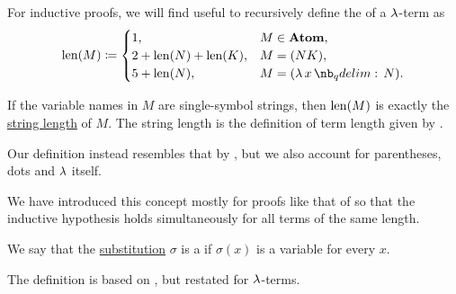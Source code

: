 \begin{definition}\label{def:lambda_term_length}\mimprovised
  For inductive proofs, we will find useful to recursively define the  of a \( \mathrm{\lambda} \)-term as
  \begin{equation*}
    \len(M) \coloneqq \begin{cases}
      1,                     &M \in \op*{Atom}, \\
      2 + \len(N) + \len(K), &M = (NK), \\
      5 + \len(N),           &M = (\qabs x N). \\
    \end{cases}
  \end{equation*}
\end{definition}
\begin{comments}
  \item If the variable names in \( M \) are single-symbol strings, then \( \operatorname{len}(M) \) is exactly the \hyperref[def:formal_language/string_length]{string length} of \( M \). The string length is the definition of term length given by .

  Our definition instead resembles that by , but we also account for parentheses, dots and \( \mathrm{\lambda} \) itself.

  \item We have introduced this concept mostly for proofs like that of  so that the inductive hypothesis holds simultaneously for all terms of the same length.
\end{comments}

\begin{definition}\label{def:lambda_renaming}
  We say that the \hyperref[def:lambda_substitution]{substitution} \( \sigma \) is a  if \( \sigma(x) \) is a variable for every \( x \).
\end{definition}
\begin{comments}
  \item The definition is based on \cite[252]{Mimram2020Types}, but restated for \( \mathrm{\lambda} \)-terms.
\end{comments}

